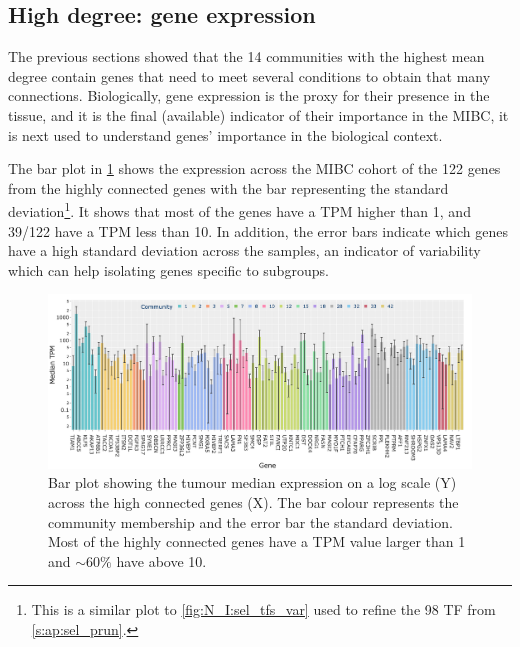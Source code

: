 \subsection{High degree: gene expression} \label{s:N_II:high_ge}

The previous sections showed that the 14 communities with the highest mean degree contain genes that need to meet several conditions to obtain that many connections. Biologically, gene expression is the proxy for their presence in the tissue, and it is the final (available) indicator of their importance in the MIBC, it is next used to understand genes' importance in the biological context.

The bar plot in \cref{fig:N_II:exp_molecular_highCon} shows the expression across the MIBC cohort of the 122 genes from the highly connected genes with the bar representing the standard deviation\footnote{This is a similar plot to \cref{fig:N_I:sel_tfs_var} used to refine the  98 TF from \cref{s:ap:sel_prun}.}. It shows that most of the genes have a TPM higher than 1, and 39/122 have a TPM less than 10. In addition, the error bars indicate which genes have a high standard deviation across the samples, an indicator of variability which can help isolating genes specific to subgroups. 


\begin{figure}[!b]    
    \centering
    \includegraphics[width=1.0\textwidth,height=1.0\textheight,keepaspectratio]{Sections/Network_II/resources/reward/smallCom_Exp.png}
   \caption[Tumour median TPMs of highly connected genes]{Bar plot showing the tumour median expression on a log scale (Y) across the high connected genes (X). The bar colour represents the community membership and the error bar the standard deviation. Most of the highly connected genes have a TPM value larger than 1 and $\sim60\%$ have above 10. }
    \label{fig:N_II:exp_molecular_highCon}
\end{figure}

